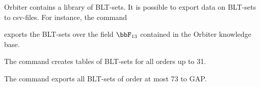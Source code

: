 Orbiter contains a library of BLT-sets.
It is possible to export data on BLT-sets to csv-files. 
For instance, 
the command 


exports the BLT-sets over the field $\bbF_{13}$ 
contained in the Orbiter knowledge base.

\bigskip

The command 
creates tables of BLT-sets for all orders up to 31.


\bigskip

The command 
exports all BLT-sets of order at most 73 to GAP.

